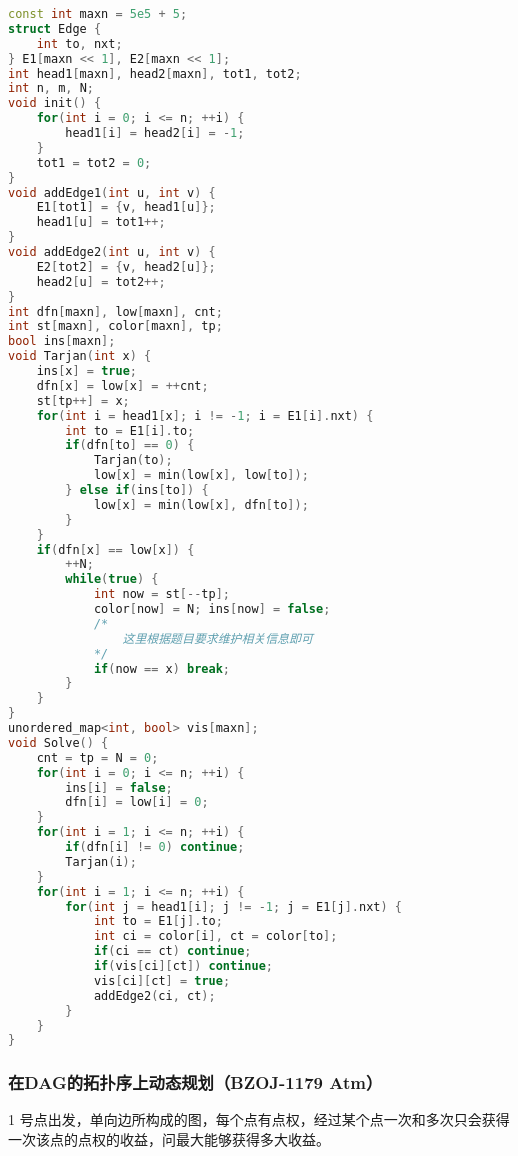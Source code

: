 \begin{lstlisting}[language=C++]
const int maxn = 5e5 + 5;
struct Edge {
    int to, nxt;
} E1[maxn << 1], E2[maxn << 1];
int head1[maxn], head2[maxn], tot1, tot2;
int n, m, N;
void init() {
    for(int i = 0; i <= n; ++i) {
        head1[i] = head2[i] = -1;
    }
    tot1 = tot2 = 0;
}
void addEdge1(int u, int v) {
    E1[tot1] = {v, head1[u]};
    head1[u] = tot1++;
}
void addEdge2(int u, int v) {
    E2[tot2] = {v, head2[u]};
    head2[u] = tot2++;
}
int dfn[maxn], low[maxn], cnt;
int st[maxn], color[maxn], tp;
bool ins[maxn];
void Tarjan(int x) {
    ins[x] = true;
    dfn[x] = low[x] = ++cnt;
    st[tp++] = x;
    for(int i = head1[x]; i != -1; i = E1[i].nxt) {
        int to = E1[i].to;
        if(dfn[to] == 0) {
            Tarjan(to);
            low[x] = min(low[x], low[to]);
        } else if(ins[to]) {
            low[x] = min(low[x], dfn[to]);
        }
    }
    if(dfn[x] == low[x]) {
        ++N;
        while(true) {
            int now = st[--tp];
            color[now] = N; ins[now] = false;
            /*
                这里根据题目要求维护相关信息即可
            */
            if(now == x) break;
        }
    }
}
unordered_map<int, bool> vis[maxn];
void Solve() {
    cnt = tp = N = 0;
    for(int i = 0; i <= n; ++i) {
        ins[i] = false;
        dfn[i] = low[i] = 0;
    }
    for(int i = 1; i <= n; ++i) {
        if(dfn[i] != 0) continue;
        Tarjan(i);
    }
    for(int i = 1; i <= n; ++i) {
        for(int j = head1[i]; j != -1; j = E1[j].nxt) {
            int to = E1[j].to;
            int ci = color[i], ct = color[to];
            if(ci == ct) continue;
            if(vis[ci][ct]) continue;
            vis[ci][ct] = true;
            addEdge2(ci, ct);
        }
    }
}
\end{lstlisting}

\subsubsection{在DAG的拓扑序上动态规划（BZOJ-1179 Atm）}

1 号点出发，单向边所构成的图，每个点有点权，经过某个点一次和多次只会获得一次该点的点权的收益，问最大能够获得多大收益。


